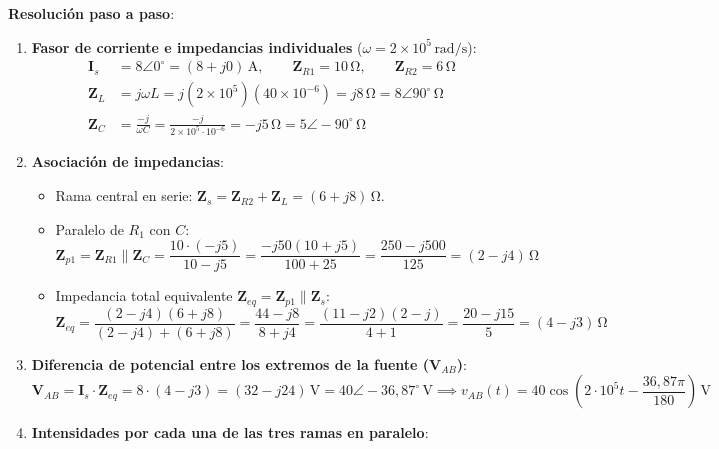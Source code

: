 \begin{ejercicio}
\textbf{Resolución paso a paso}:
\begin{enumerate}
    \item \textbf{Fasor de corriente e impedancias individuales} ($\omega = 2\times 10^5\,\si{\radian/\second}$):
    \begin{align*}
        \mathbf{I}_s &= 8\angle 0^\circ = (8 + j 0)\,\si{\ampere}, \qquad \mathbf{Z}_{R1} = 10\,\si{\ohm}, \qquad \mathbf{Z}_{R2} = 6\,\si{\ohm} \\
        \mathbf{Z}_L &= j\omega L = j(2\times 10^5)(40\times 10^{-6}) = j 8\,\si{\ohm} = 8\angle 90^\circ\,\si{\ohm} \\
        \mathbf{Z}_C &= \frac{-j}{\omega C} = \frac{-j}{2\times 10^5 \cdot 10^{-6}} = -j 5\,\si{\ohm} = 5\angle -90^\circ\,\si{\ohm}
    \end{align*}
    \item \textbf{Asociación de impedancias}:
    \begin{itemize}
        \item Rama central en serie: $\mathbf{Z}_s = \mathbf{Z}_{R2} + \mathbf{Z}_L = (6 + j 8)\,\si{\ohm}$.
        \item Paralelo de $R_1$ con $C$:
        \begin{equation*}
            \mathbf{Z}_{p1} = \mathbf{Z}_{R1} \parallel \mathbf{Z}_C = \frac{10\cdot(-j 5)}{10 - j 5} = \frac{-j 50(10 + j 5)}{100 + 25} = \frac{250 - j 500}{125} = (2 - j 4)\,\si{\ohm}
        \end{equation*}
        \item Impedancia total equivalente $\mathbf{Z}_{eq} = \mathbf{Z}_{p1} \parallel \mathbf{Z}_s$:
        \begin{equation*}
            \mathbf{Z}_{eq} = \frac{(2 - j 4)(6 + j 8)}{(2 - j 4) + (6 + j 8)} = \frac{44 - j 8}{8 + j 4} = \frac{(11 - j 2)(2 - j)}{4 + 1} = \frac{20 - j 15}{5} = \boxed{(4 - j 3)\,\si{\ohm}}
        \end{equation*}
    \end{itemize}
    \item \textbf{Diferencia de potencial entre los extremos de la fuente ($\mathbf{V}_{AB}$)}:
    \begin{equation*}
        \mathbf{V}_{AB} = \mathbf{I}_s \cdot \mathbf{Z}_{eq} = 8\cdot(4 - j 3) = (32 - j 24)\,\si{\volt} = 40\angle -36{,}87^\circ\,\si{\volt} \implies \boxed{v_{AB}(t) = 40\cos\left(2\cdot 10^5 t - \frac{36{,}87\pi}{180}\right)\,\si{\volt}}
    \end{equation*}
    \item \textbf{Intensidades por cada una de las tres ramas en paralelo}:

\end{enumerate}
\end{ejercicio}
